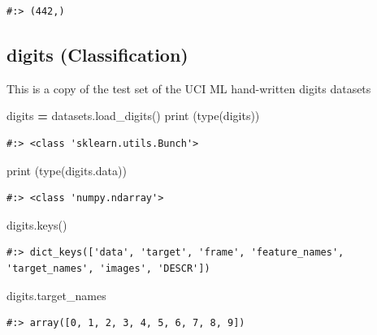 \documentclass[
]{book}
\newenvironment{Shaded}{\begin{snugshade}}{\end{snugshade}}
\newcommand{\BuiltInTok}[1]{#1}
\newcommand{\NormalTok}[1]{#1}
\newcommand{\OperatorTok}[1]{\textcolor[rgb]{0.43,0.43,0.43}{\textbf{#1}}}
\begin{document}
\begin{verbatim}
#:> (442,)
\end{verbatim}

\hypertarget{digits-classification}{%
\subsection{digits (Classification)}\label{digits-classification}}

This is a copy of the test set of the UCI ML hand-written digits datasets

\begin{Shaded}
\begin{Highlighting}[]
\NormalTok{digits }\OperatorTok{=}\NormalTok{ datasets.load_digits()}
\BuiltInTok{print}\NormalTok{ (}\BuiltInTok{type}\NormalTok{(digits))}
\end{Highlighting}
\end{Shaded}

\begin{verbatim}
#:> <class 'sklearn.utils.Bunch'>
\end{verbatim}

\begin{Shaded}
\begin{Highlighting}[]
\BuiltInTok{print}\NormalTok{ (}\BuiltInTok{type}\NormalTok{(digits.data))}
\end{Highlighting}
\end{Shaded}

\begin{verbatim}
#:> <class 'numpy.ndarray'>
\end{verbatim}

\begin{Shaded}
\begin{Highlighting}[]
\NormalTok{digits.keys()}
\end{Highlighting}
\end{Shaded}

\begin{verbatim}
#:> dict_keys(['data', 'target', 'frame', 'feature_names', 'target_names', 'images', 'DESCR'])
\end{verbatim}

\begin{Shaded}
\begin{Highlighting}[]
\NormalTok{digits.target_names}
\end{Highlighting}
\end{Shaded}

\begin{verbatim}
#:> array([0, 1, 2, 3, 4, 5, 6, 7, 8, 9])
\end{verbatim}
\end{document}
